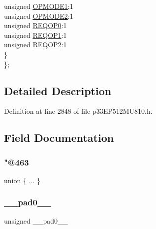 \begin{DoxyCompactItemize}
\begin{tabbing}
\>\>unsigned \hyperlink{structtag_c1_c_t_r_l1_b_i_t_s_ac1a3a1e4bc60876e8fffd5fa5a4438d0}{OPMODE1}:1\\
\>\>unsigned \hyperlink{structtag_c1_c_t_r_l1_b_i_t_s_a8da4b1152099e22fc9039236c54cad0d}{OPMODE2}:1\\
\>\>unsigned \hyperlink{structtag_c1_c_t_r_l1_b_i_t_s_a7d461c6ec9a4d57968eb5e01eb49b4bd}{REQOP0}:1\\
\>\>unsigned \hyperlink{structtag_c1_c_t_r_l1_b_i_t_s_a0f28e42eb67e01b2b0b5e0f80f9b549d}{REQOP1}:1\\
\>\>unsigned \hyperlink{structtag_c1_c_t_r_l1_b_i_t_s_adc514515672b885adedefd72b3633293}{REQOP2}:1\\
\>\} \\
\}; \\

\end{tabbing}\end{DoxyCompactItemize}


\subsection{Detailed Description}


Definition at line 2848 of file p33\+E\+P512\+M\+U810.\+h.



\subsection{Field Documentation}
\mbox{\label{structtag_c1_c_t_r_l1_b_i_t_s_a25a461123483e8efbeff98ddd01071e7}} 
\subsubsection{\texorpdfstring{"@463}{@463}}
{\footnotesize\ttfamily union \{ ... \} }

\mbox{\label{structtag_c1_c_t_r_l1_b_i_t_s_adf71f3d8410c1f1dbbc96680a92c49af}} 
\subsubsection{\texorpdfstring{\+\_\+\+\_\+pad0\+\_\+\+\_\+}{\_\_pad0\_\_}}
{\footnotesize\ttfamily unsigned \+\_\+\+\_\+pad0\+\_\+\+\_\+}



